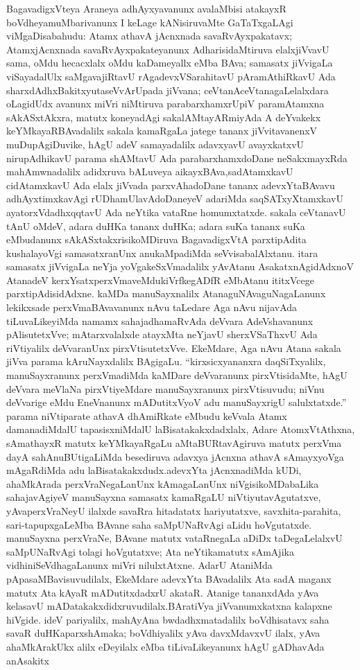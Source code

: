 BagavadigxVteya Araneya adhAyxyavanunx avalaMbisi atakayxR boVdheya\break muMba\-rivanunx I keLage kANisiruvaMte GaTaTxgaLAgi viMgaDisabahudu: Atamx athavA jAcnxnada savaRvAyxpakatavx; AtamxjAcnxnada savaRvAyxpakateyanunx AdharisidaMtiruva elalx\break jiVvavU sama, oMdu hecacxlalx oMdu kaDameyallx eMba BAva; samasatx jiVvigaLa viSaya\-dalUlx saMgavajiRtavU rAgadevxVSarahitavU pAramAthiRkavU Ada sharxdAdhxBakitxyuta\break seVvA\-rUpada jiVvana; ceVtanAceVtanagaLelalxdara oLagidUdx avanunx miVri niMtiruva parabarxhamxrUpiV paramAtamxna sAkASxtAkxra, matutx koneyadAgi sakalAMtayARmiyAda A deYvakekx keYMkayaRBAvadalilx sakala kamaRgaLa jatege tananx jiVvitavanenxV muDupAgiDu\-vike, hAgU adeV samayadalilx adavxyavU avayxkatxvU nirupAdhikavU parama shAMtavU Ada parabarxhamxdoDane neSakxmayxRda mahAmwnadalilx adidxruva bALuveya aikayxBAva,\break sadAtamxkavU cidAtamxkavU Ada elalx jiVvada parxvAhadoDane tananx adevxYtaBAvavu adhAyx\-timxkavAgi rUDhamUlavAdoDaneyeV adariMda saqSATxyXtamxkavU ayatorxVdadhxqqtavU Ada neYtika vataRne homumxtatxde. sakala ceVtanavU tAnU oMdeV, adara duHKa tananx duHKa; adara suKa tananx suKa eMbudanunx sAkASxtakxrisikoMDiruva BagavadigxVtA parxtipAdita kushalayoVgi samasatxranUnx anukaMpadiMda seVvisabalAlxtanu. itara samasatx jiVvi\-gaLa neYja yoVgakeSxVmadalilx yAvAtanu AsakatxnAgidAdxnoV AtanadeV kerxYsatxperxVmaveMdu\break kiVrfkegADfR eMbAtanu ititxVcege parxtipAdisidAdxne. kaMDa manuSayxnalilx Atana\break guNAva\-guNagaLanunx lekikxsade perxVmaBAvavanunx nAvu taLedare Aga nAvu nijavAda tiLu\-vaLikeyiMda namamx sahajadhamaRvAda deVvara AdeVshavanunx pAlisutetxVve; mAtarxvalalxde atayxMta neYjavU sherxVSaThxvU Ada riVtiyalilx deVvaranUnx pirxVtisutetxVve. EkeMdare, Aga nAvu Atana sakala jiVva parama kAruNayxdalilx BAgigaLu. ``kirxsicxyananxra daqSiTxyalilx, manu\-Sayxranunx perxVmadiMda kaMDare deVvaranunx pirxVtisidaMte, hAgU deVvara meVlaNa pirxVtiyeMdare manuSayxranunx pirxVtisuvudu; niVnu deVvarige eMdu EneVnanunx mADutitxVyoV adu manuSayxrigU salulxtatxde.'' parama niVtiparate athavA dhAmiRkate eMbudu keVvala Atamx damanadiMdalU tapasisxniMdalU laBisatakakxdadxlalx, Adare AtomxVtAthxna, \hbox{sAmathayxR} matutx keYMkayaRgaLu aMtaBURtavAgiruva matutx perxVma dayA sahAnuBUti\-gaLiMda besediruva adavxya jAcnxna athavA sAmayxyoVga mAgaRdiMda adu laBisa\-takakxdudx.\break adevxYta jAcnxnadiMda kUDi, ahaMkArada perxVraNegaLanUnx kAmagaLanUnx niVgisi\-koMDa\break baLika sahajavAgiyeV manuSayxna samasatx kamaRgaLU niVtiyutavAgutatxve, yAva\break perxVraNeyU ilalxde savaRra hitadatatx hariyutatxve, savxhita-parahita, sari-tapupx\-gaLeMba BAvane saha saMpUNaRvAgi aLidu hoVgutatxde. manuSayxna perxVraNe, BAvane matutx vataRnegaLa aDiDx taDegaLelalxvU saMpUNaRvAgi tolagi hoVgutatxve; Ata neYtika\break matutx sAmAjika vidhiniSeVdhagaLanunx miVri nilulxtAtxne. AdarU AtaniMda pApa\break saMBavisuvudilalx, EkeMdare adevxYta BAvadalilx Ata sadA maganx matutx Ata kAyaR mADutitxdadxrU akataR. Atanige tananxdAda yAva kelasavU mADatakakxdidxruvudilalx.\break BAra\-tiVya jiVvanumxkatxna kalapxne hiVgide. ideV pariyalilx, mahAyAna bwdadhxmatadalilx boVdhisatavx saha savaR duHKaparxshAmaka; boVdhiyalilx yAva davxMdavxvU ilalx, yAva ahaMkArakUkx alilx eDeyilalx eMba tiLivaLikeyanunx hAgU gADhavAda anAsakitx 